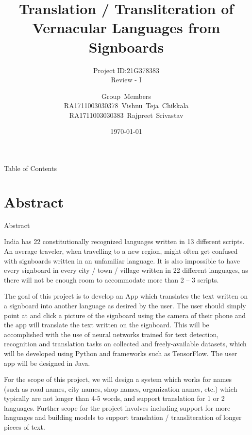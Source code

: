 \documentclass{beamer}
\title[21G378383]{Translation / Transliteration of Vernacular Languages from Signboards}
\subtitle{Project ID:21G378383\\Review - I}
\author[SRM Institute of Science \& Technology]{Group~Members\\RA1711003030378~Vishnu~Teja~Chikkala\\RA1711003030383~Rajpreet~Srivastav\\ \medskip{Supervised By:\\Mr.~Sunil~Kumar\\Assistant~Professor}}
\institute[]{Department of Computer Science \& Engineering\\Faculty of Engineering \& Technology\\SRM Institute of Science \& Technology}
\date{\today}
\begin{document}
	\begin{frame}
		\maketitle
		\date{}
			\end{frame}
	\begin{frame}[allowframebreaks]{Table of Contents} %
		\tableofcontents[sections={1-6}]
	\end{frame}
	\section{Abstract}
	\begin{frame}[allowframebreaks]{Abstract}
		
	India has 22 constitutionally recognized languages written in 13 different scripts. An average traveler, when travelling to a new region, might often get confused with signboards written in an unfamiliar language. It is also impossible to have every signboard in every city / town / village written in 22 different languages, as there will not be enough room to accommodate more than 2 – 3 scripts. \par
The goal of this project is to develop an App which translates the text written on a signboard into another language as desired by the user. The user should simply point at and click a picture of the signboard using the camera of their phone and the app will translate the text written on the signboard. This will be accomplished with the use of neural networks trained for text detection, recognition and translation tasks on collected and freely-available datasets, which will be developed using Python and frameworks such as TensorFlow. The user app will be designed in Java. \par
For the scope of this project, we will design a system which works for names (such as road names, city names, shop names, organization names, etc.) which typically are not longer than 4-5 words, and support translation for 1 or 2 languages. Further scope for the project involves including support for more languages and building models to support translation / transliteration of longer pieces of text.
	\end{frame}
\end{document}
